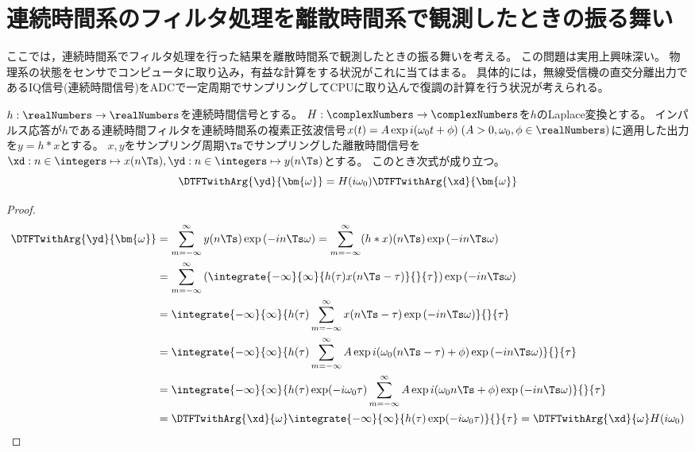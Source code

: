 \section{連続時間系のフィルタ処理を離散時間系で観測したときの振る舞い}
    ここでは，連続時間系でフィルタ処理を行った結果を離散時間系で観測したときの振る舞いを考える。
    この問題は実用上興味深い。
    物理系の状態をセンサでコンピュータに取り込み，有益な計算をする状況がこれに当てはまる。
    具体的には，無線受信機の直交分離出力であるIQ信号(連続時間信号)をADCで一定周期でサンプリングしてCPUに取り込んで復調の計算を行う状況が考えられる。
    \begin{shadebox}
        $h:\realNumbers\to\realNumbers$を連続時間信号とする。
        $H:\complexNumbers\to\complexNumbers$を$h$のLaplace変換とする。
        インパルス応答が$h$である連続時間フィルタを連続時間系の複素正弦波信号$x(t) = A\exp i(\omega_0 t + \phi)\;(A>0,\omega_0,\phi\in\realNumbers)$に適用した出力を$y=h*x$とする。
        $x,y$をサンプリング周期$\Ts$でサンプリングした離散時間信号を$\xd: n\in\integers\mapsto x(n\Ts), \yd: n\in\integers\mapsto y(n\Ts)$とする。
        このとき次式が成り立つ。
        \[ \DTFTwithArg{\yd}{\bm{\omega}} = H(i\omega_0)\DTFTwithArg{\xd}{\bm{\omega}} \]
    \end{shadebox}
    \begin{proof}
        \begin{align*}
            \DTFTwithArg{\yd}{\bm{\omega}} &= \sum_{m=-\infty}^\infty y(n\Ts)\exp \left(-i n\Ts\omega\right) = \sum_{m=-\infty}^\infty (h*x)(n\Ts)\exp \left(-i n\Ts\omega\right) \\
            &= \sum_{m=-\infty}^\infty \left(\integrate{-\infty}{\infty}{h(\tau)x(n\Ts-\tau)}{}{\tau}\right)\exp \left(-i n\Ts\omega\right) \\
            &= \integrate{-\infty}{\infty}{h(\tau)\sum_{m=-\infty}^\infty x(n\Ts-\tau)\exp \left(-i n\Ts\omega\right)}{}{\tau} \\
            &= \integrate{-\infty}{\infty}{h(\tau)\sum_{m=-\infty}^\infty A\exp i(\omega_0 (n\Ts-\tau) + \phi)\exp \left(-i n\Ts\omega\right)}{}{\tau} \\
            &= \integrate{-\infty}{\infty}{h(\tau) \exp(-i\omega_0\tau)\sum_{m=-\infty}^\infty A\exp i(\omega_0 n\Ts + \phi)\exp \left(-i n\Ts\omega\right)}{}{\tau} \\
            &= \DTFTwithArg{\xd}{\omega} \integrate{-\infty}{\infty}{h(\tau) \exp(-i\omega_0\tau)}{}{\tau} = \DTFTwithArg{\xd}{\omega}H(i\omega_0)
        \end{align*}
    \end{proof}